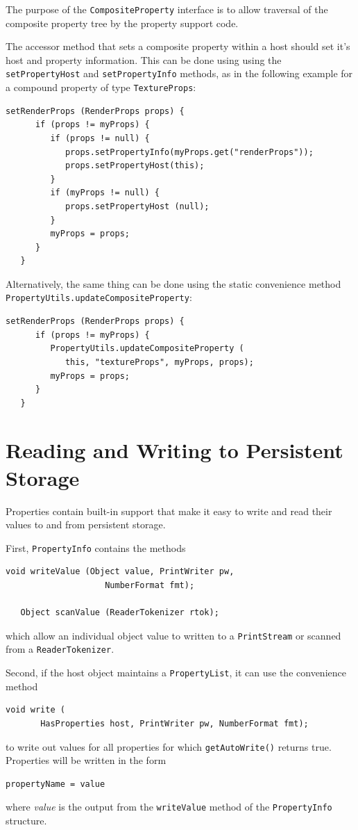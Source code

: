 The purpose of the {\tt CompositeProperty} interface is to allow
traversal of the composite property tree by the property support code.

The accessor method that sets a composite property within a host
should set it's host and property information. This can be done using
using the {\tt setPropertyHost} and {\tt setPropertyInfo} methods, as
in the following example for a compound property of type 
{\tt TextureProps}:
\begin{lstlisting}[]
   setRenderProps (RenderProps props) {
      if (props != myProps) {
         if (props != null) {
            props.setPropertyInfo(myProps.get("renderProps")); 
            props.setPropertyHost(this);
         }
         if (myProps != null) {
            props.setPropertyHost (null);
         }
         myProps = props;
      }
   }
\end{lstlisting}
Alternatively, the same thing can be done using the static convenience
method {\tt PropertyUtils.updateCompositeProperty}:
\begin{lstlisting}[]
   setRenderProps (RenderProps props) {
      if (props != myProps) {
         PropertyUtils.updateCompositeProperty (
            this, "textureProps", myProps, props);
         myProps = props;
      }
   }
\end{lstlisting}

\label{readWriteSec}
\section{Reading and Writing to Persistent Storage }

Properties contain built-in support that make it easy to write and
read their values to and from persistent storage. 

First, {\tt PropertyInfo} contains the methods
\begin{lstlisting}[]
   void writeValue (Object value, PrintWriter pw, 
                    NumberFormat fmt);

   Object scanValue (ReaderTokenizer rtok);
\end{lstlisting}
which allow an individual object value to written to
a {\tt PrintStream} or scanned from a {\tt ReaderTokenizer}.

Second, if the host object maintains a {\tt PropertyList},
it can use the convenience method 
\begin{lstlisting}[]
   void write (
       HasProperties host, PrintWriter pw, NumberFormat fmt);
\end{lstlisting}
to write out values for all properties for which 
{\tt getAutoWrite()} returns true. Properties will be written in
the form
\begin{lstlisting}[]
   propertyName = value  
\end{lstlisting}
where {\it value} is the output from the {\tt writeValue}
method of the {\tt PropertyInfo} structure.

